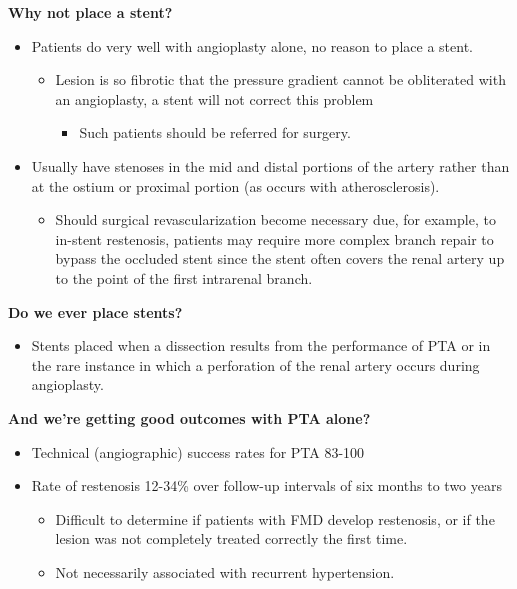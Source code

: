 \documentclass[
]{book}
\providecommand{\tightlist}{%
  \setlength{\itemsep}{0pt}\setlength{\parskip}{0pt}}
\begin{document}
\textbf{Why not place a stent?}

\begin{itemize}
\item
  Patients do very well with angioplasty alone, no reason to place a
  stent.

  \begin{itemize}
  \item
    Lesion is so fibrotic that the pressure gradient cannot be
    obliterated with an angioplasty, a stent will not correct this
    problem

    \begin{itemize}
    \tightlist
    \item
      Such patients should be referred for surgery.
    \end{itemize}
  \end{itemize}
\item
  Usually have stenoses in the mid and distal portions of the artery
  rather than at the ostium or proximal portion (as occurs with
  atherosclerosis).

  \begin{itemize}
  \tightlist
  \item
    Should surgical revascularization become necessary due, for
    example, to in-stent restenosis, patients may require more
    complex branch repair to bypass the occluded stent since the
    stent often covers the renal artery up to the point of the first
    intrarenal branch.
  \end{itemize}
\end{itemize}

\textbf{Do we ever place stents?}

\begin{itemize}
\tightlist
\item
  Stents placed when a dissection results from the performance of PTA
  or in the rare instance in which a perforation of the renal artery
  occurs during angioplasty.
\end{itemize}

\textbf{And we're getting good outcomes with PTA alone?}

\begin{itemize}
\item
  Technical (angiographic) success rates for PTA 83-100
\item
  Rate of restenosis 12-34\% over follow-up intervals of six months to
  two years

  \begin{itemize}
  \item
    Difficult to determine if patients with FMD develop restenosis,
    or if the lesion was not completely treated correctly the first
    time.
  \item
    Not necessarily associated with recurrent hypertension.
  \end{itemize}
\end{itemize}
\end{document}
